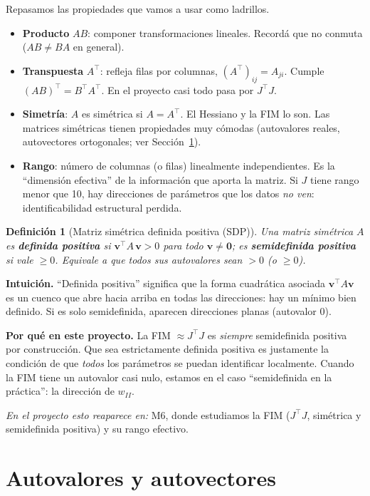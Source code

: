 \documentclass[11pt,a4paper]{article}
\newtheorem{definition}{Definición}
\newcommand{\transp}{^{\top}}
\begin{document}
Repasamos las propiedades que vamos a usar como ladrillos.

\begin{itemize}[leftmargin=1.4em]
  \item \textbf{Producto} $AB$: componer transformaciones lineales. Recordá que no conmuta ($AB\neq BA$ en general).
  \item \textbf{Transpuesta} $A\transp$: refleja filas por columnas, $(A\transp)_{ij}=A_{ji}$. Cumple $(AB)\transp=B\transp A\transp$. En el proyecto casi todo pasa por $J\transp J$.
  \item \textbf{Simetría}: $A$ es simétrica si $A=A\transp$. El Hessiano y la FIM lo son. Las matrices simétricas tienen propiedades muy cómodas (autovalores reales, autovectores ortogonales; ver Sección~\ref{sec:auto}).
  \item \textbf{Rango}: número de columnas (o filas) linealmente independientes. Es la ``dimensión efectiva'' de la información que aporta la matriz. Si $J$ tiene rango menor que 10, hay direcciones de parámetros que los datos \emph{no ven}: identificabilidad estructural perdida.
\end{itemize}

\begin{definition}[Matriz simétrica definida positiva (SDP)]
Una matriz simétrica $A$ es \textbf{definida positiva} si $\mathbf{v}\transp A\,\mathbf{v}>0$ para todo $\mathbf{v}\neq\bm 0$; es \textbf{semidefinida positiva} si vale $\ge 0$. Equivale a que todos sus autovalores sean $>0$ (o $\ge0$).
\end{definition}

\textbf{Intuición.} ``Definida positiva'' significa que la forma cuadrática asociada $\mathbf{v}\transp A\mathbf{v}$ es un cuenco que abre hacia arriba en todas las direcciones: hay un mínimo bien definido. Si es solo semidefinida, aparecen direcciones planas (autovalor $0$).

\textbf{Por qué en este proyecto.} La FIM $\approx J\transp J$ es \emph{siempre} semidefinida positiva por construcción. Que sea estrictamente definida positiva es justamente la condición de que \emph{todos} los parámetros se puedan identificar localmente. Cuando la FIM tiene un autovalor casi nulo, estamos en el caso ``semidefinida en la práctica'': la dirección de $w_{II}$.

\emph{En el proyecto esto reaparece en:} M6, donde estudiamos la FIM ($J\transp J$, simétrica y semidefinida positiva) y su rango efectivo.

\section{Autovalores y autovectores}\label{sec:auto}
\end{document}
